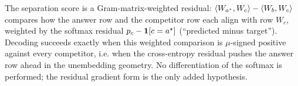 \begin{remark}
\label{rem:ce-reading}
The separation score is a Gram-matrix-weighted residual: $\left\langle W_{a^{\star}}, W_c \right\rangle - \left\langle W_{b}, W_c \right\rangle$
compares how the answer row and the competitor row each align with row $W_c$, weighted by the
softmax residual $p_c - \mathbf{1}\!\left[c = a^{\star}\right]$ (``predicted minus target''). Decoding succeeds
exactly when this weighted comparison is $\mu$-signed positive against every competitor, i.e.
when the cross-entropy residual pushes the answer row ahead in the unembedding geometry. No
differentiation of the softmax is performed; the residual gradient form is the only added
hypothesis.
\end{remark}
